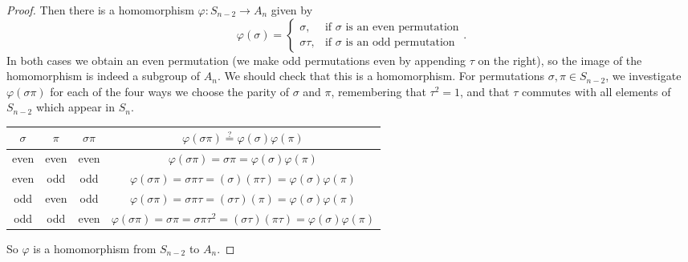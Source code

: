 \documentclass[11pt]{article}
\begin{document}
\begin{enumerate}
\begin{proof}
      Then there is a homomorphism $\varphi\colon S_{n-2}\to A_n$ given by
      \[\varphi(\sigma) = \begin{cases}
        \sigma, & \text{if $\sigma$ is an even permutation} \\
        \sigma\tau, & \text{if $\sigma$ is an odd permutation}
      \end{cases}.\]
      In both cases we obtain an even permutation (we make odd permutations even by appending $\tau$ on the right), so the image of the homomorphism is indeed a subgroup of $A_n$. We should check that this is a homomorphism. For permutations $\sigma,\pi\in S_{n-2}$, we investigate $\varphi(\sigma\pi)$ for each of the four ways we choose the parity of $\sigma$ and $\pi$, remembering that $\tau^2 = 1$, and that $\tau$ commutes with all elements of $S_{n-2}$ which appear in $S_n$.
      \begin{center}
        \begin{tabular}{ c|c|c|c } 
         $\sigma$ & $\pi$ & $\sigma\pi$ & $\varphi(\sigma\pi)\overset{?}{=} \varphi(\sigma)\varphi(\pi)$ \\ 
         \hline
         even & even & even & $\varphi(\sigma\pi) = \sigma\pi = \varphi(\sigma)\varphi(\pi)$ \\
         even & odd & odd & $\varphi(\sigma\pi) = \sigma\pi\tau = (\sigma)(\pi\tau) = \varphi(\sigma)\varphi(\pi)$ \\
         odd & even & odd & $\varphi(\sigma\pi) = \sigma\pi\tau = (\sigma\tau)(\pi) = \varphi(\sigma)\varphi(\pi)$ \\
         odd & odd & even & $\varphi(\sigma\pi) = \sigma\pi = \sigma\pi\tau^2 = (\sigma\tau)(\pi\tau) = \varphi(\sigma)\varphi(\pi)$ \\
        \end{tabular}
        \end{center}
        So $\varphi$ is a homomorphism from $S_{n-2}$ to $A_n$. 
        

\end{proof}
\end{enumerate}
\end{document}
